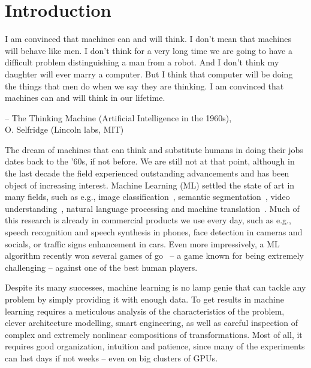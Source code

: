 \chapter{Introduction}


{
    \setlength\epigraphwidth{10cm}
    \setlength\epigraphrule{0pt}
    \renewcommand{\epigraphflush}{center}
    \epigraph{
        I am convinced that machines can and will think. I don't mean that
        machines will behave like men. I don't think for a very long time we
        are going to have a difficult problem distinguishing a man from a
        robot. And I don't think my daughter will ever marry a computer. But I
        think that computer will be doing the things that men do when we say
        they are thinking. I am convinced that machines can and will think in
        our lifetime.}{-- \textup{The Thinking Machine (Artificial Intelligence
            in the 1960s)}, \\ O. Selfridge (Lincoln labs, MIT)}
}

The dream of machines that can think and substitute humans in doing their jobs
dates back to the '60s, if not before. We are still not at that point, although
in the last decade the field experienced outstanding advancements and has been
object of increasing interest. Machine Learning (ML) settled the state of art
in many fields, such as e.g., image classification~\cite{Krizhevsky-2012,
szegedy2016inception, visin2015renet}, semantic
segmentation~\cite{chen2015semantic, Visin_2016_CVPR_Workshops}, video
understanding~\citep{srivastava2015unsupervised, Xu-et-al-arxiv2015}, natural
language processing and machine translation~\citep{Bahdanau-et-al-arxiv2014}.
Much of this research is already in commercial products we use every day, such
as e.g., speech recognition and speech synthesis in phones, face detection in
cameras and socials, or traffic signs enhancement in cars. Even more
impressively, a ML algorithm recently won several games of
go~\citep{silver2016alphago} -- a game known for being extremely challenging --
against one of the best human players.

Despite its many successes, machine learning is no lamp genie that can tackle
any problem by simply providing it with enough data. To get results in
machine learning requires a meticulous analysis of the characteristics of the
problem, clever architecture modelling, smart engineering, as well as careful
inspection of complex and extremely nonlinear compositions of transformations.
Most of all, it requires good organization, intuition and patience, since many
of the experiments can last days if not weeks -- even on big clusters of GPUs.

